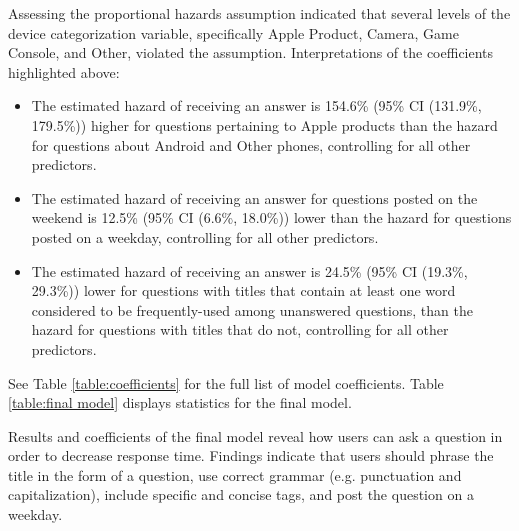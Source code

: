 \documentclass{article}
\begin{document}
Assessing the proportional hazards assumption indicated that several levels of the device categorization variable, specifically Apple Product, Camera, Game Console, and Other, violated the assumption. Interpretations of the coefficients highlighted above:

\begin{itemize}
  \item The estimated hazard of receiving an answer is 154.6\% (95\% CI (131.9\%, 179.5\%)) higher for questions pertaining to Apple products than the hazard for questions about Android and Other phones, controlling for all other predictors.
  \item The estimated hazard of receiving an answer for questions posted on the weekend is 12.5\% (95\% CI (6.6\%, 18.0\%)) lower than the hazard for questions posted on a weekday, controlling for all other predictors.
  \item The estimated hazard of receiving an answer is 24.5\% (95\% CI (19.3\%, 29.3\%)) lower for questions with titles that contain at least one word considered to be frequently-used among unanswered questions, than the hazard for questions with titles that do not, controlling for all other predictors. 
\end{itemize}

See Table \ref{table:coefficients} for the full list of model coefficients. Table \ref{table:final model} displays statistics for the final model. 

Results and coefficients of the final model reveal how users can ask a question in order to decrease response time. Findings indicate that users should phrase the title in the form of a question, use correct grammar (e.g. punctuation and capitalization), include specific and concise tags, and post the question on a weekday. 
\end{document}

